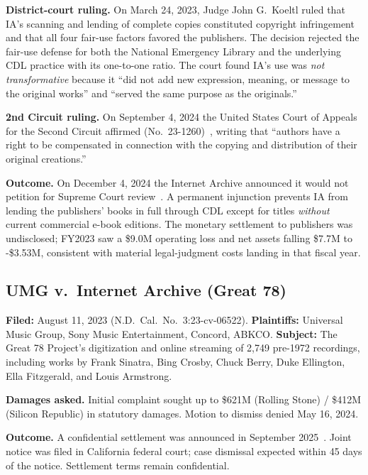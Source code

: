 \documentclass[10pt,letterpaper,twocolumn]{article}
\begin{document}
\textbf{District-court ruling.} On March 24, 2023, Judge John G.~Koeltl ruled that IA's scanning and lending of complete copies constituted copyright infringement and that all four fair-use factors favored the publishers. The decision rejected the fair-use defense for both the National Emergency Library and the underlying CDL practice with its one-to-one ratio. The court found IA's use was \emph{not transformative} because it ``did not add new expression, meaning, or message to the original works'' and ``served the same purpose as the originals.''

\textbf{2nd Circuit ruling.} On September 4, 2024 the United States Court of Appeals for the Second Circuit affirmed (No.~23-1260)~\citep{hachette2024affirm}, writing that ``authors have a right to be compensated in connection with the copying and distribution of their original creations.''

\textbf{Outcome.} On December 4, 2024 the Internet Archive announced it would not petition for Supreme Court review~\citep{iablog2024endhachette}. A permanent injunction prevents IA from lending the publishers' books in full through CDL except for titles \emph{without} current commercial e-book editions. The monetary settlement to publishers was undisclosed; FY2023 saw a \$9.0M operating loss and net assets falling \$7.7M to -\$3.53M, consistent with material legal-judgment costs landing in that fiscal year.

\subsection{UMG v.~Internet Archive (Great 78)}

\textbf{Filed:} August 11, 2023 (N.D.~Cal.~No.~3:23-cv-06522). \textbf{Plaintiffs:} Universal Music Group, Sony Music Entertainment, Concord, ABKCO. \textbf{Subject:} The Great 78 Project's digitization and online streaming of 2{,}749 pre-1972 recordings, including works by Frank Sinatra, Bing Crosby, Chuck Berry, Duke Ellington, Ella Fitzgerald, and Louis Armstrong.

\textbf{Damages asked.} Initial complaint sought up to \$621M (Rolling Stone) / \$412M (Silicon Republic) in statutory damages. Motion to dismiss denied May 16, 2024.

\textbf{Outcome.} A confidential settlement was announced in September 2025~\citep{iablog2025great78}. Joint notice was filed in California federal court; case dismissal expected within 45 days of the notice. Settlement terms remain confidential.
\end{document}
